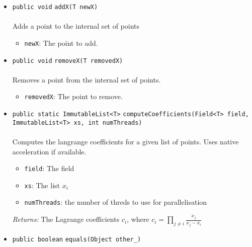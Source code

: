 \begin{itemize}
\item \lstinline|public void| \lstinline|addX|\lstinline|(T newX)|\\ \\[-0.6em]
Adds a point to the internal set of points
\begin{itemize}
\item \lstinline|newX|: The point to add.
\end{itemize}



\item \lstinline|public void| \lstinline|removeX|\lstinline|(T removedX)|\\ \\[-0.6em]
Removes a point from the internal set of points.
\begin{itemize}
\item \lstinline|removedX|: The point to remove.
\end{itemize}



\item \lstinline|public static ImmutableList<T>| \lstinline|computeCoefficients|\lstinline|(Field<T> field, ImmutableList<T> xs, int numThreads)|\\ \\[-0.6em]
Computes the langrange coefficients for a given list of points.
 Uses native acceleration if available.
\begin{itemize}
\item \lstinline|field|: The field
\item \lstinline|xs|: The list $x_i$
\item \lstinline|numThreads|: the number of threds to use for parallelisation
\end{itemize}

\emph{Returns:} The Lagrange coefficients $c_i$,
         where $c_i = \prod_{j \neq i} \frac{x_j}{x_j - x_i}$

\item \lstinline|public boolean| \lstinline|equals|\lstinline|(Object other_)| \\[-0.6em]




\end{itemize}

